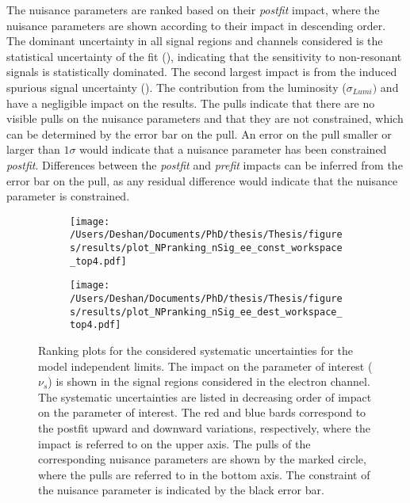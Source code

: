 The nuisance parameters are ranked based on their \emph{postfit} impact, where the nuisance parameters are shown according to their impact in descending order. The dominant uncertainty in all signal regions and channels considered is the statistical uncertainty of the fit (\STATU), indicating that the sensitivity to non-resonant signals is statistically dominated. The second largest impact is from the induced spurious signal uncertainty (\ISSU). The contribution from the luminosity ($\sigma_{Lumi})$ and \CRBU have a negligible impact on the results. The pulls indicate that there are no visible pulls on the nuisance parameters and that they are not constrained, which can be determined by the error bar on the pull. An error on the pull smaller or larger than $1\sigma$ would indicate that a nuisance parameter has been constrained \emph{postfit}. Differences between the \emph{postfit} and \emph{prefit} impacts can be inferred from the error bar on the pull, as any residual difference would indicate that the nuisance parameter is constrained. 


\begin{figure}[!htpb]
    \centering
    \begin{subfigure}[b]{0.49\textwidth}
        \centering
        \texttt{[image: /Users/Deshan/Documents/PhD/thesis/Thesis/figures/results/plot\_NPranking\_nSig\_ee\_const\_workspace\_top4.pdf]}
        \label{fig:npranking1}
    \end{subfigure}
    \begin{subfigure}[b]{0.49\textwidth}
        \centering
        \texttt{[image: /Users/Deshan/Documents/PhD/thesis/Thesis/figures/results/plot\_NPranking\_nSig\_ee\_dest\_workspace\_top4.pdf]}
        \label{fig:npranking2}
    \end{subfigure}
    \caption[Ranking plots for the considered systematic uncertainties for the model independent limits in the electron channel signal regions]{Ranking plots for the considered systematic uncertainties for the model independent limits. The impact on the parameter of interest ($\nu_s$) is shown in the signal regions considered in the electron channel. The systematic uncertainties are listed in decreasing order of impact on the parameter of interest. The red and blue bards correspond to the postfit upward and downward variations, respectively, where the impact is referred to on the upper axis. The pulls of the corresponding nuisance parameters are shown by the marked circle, where the pulls are referred to in the bottom axis. The constraint of the nuisance parameter is indicated by the black error bar. 
    }
    \label{fig:nprankingee}
\end{figure}


